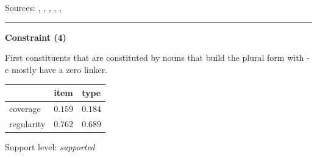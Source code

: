\vspace{0.3em}

\noindent
Sources: \citet[227]{eisenberg_2013}, \citet[572]{fuhrhop_kuerschner_2015}, \citet[9]{kuerschner_2010}, \citet[78]{nuebling_szczepaniak_2013}, \citet[83, 106]{ortner_mueller-bollhagen_1991}, \citet[229]{schaefer_2018}

\vspace{0.35em}
\hrule




\vspace{0.4em}

\begin{center}
\textbf{Constraint (4)}
\end{center}

\noindent
First constituents that are constituted by nouns that build the plural form with -e mostly have a zero linker.
\vspace{0.5em}


\vspace{-0.25em}

\begin{table}[!ht]
\begin{center}
\setlength{\extrarowheight}{1pt}
\begin{tabularx}{\columnwidth}{|X|X|X|}
\hline
 & item & type \\
\hline
 coverage & $0.159$ & $0.184$ \\
\hline
 regularity & $0.762$ & $0.689$ \\
\hline
\end{tabularx}
\end{center}
\end{table}

\vspace{-1.35em}

\noindent
Support level: \textit{supported}

\vspace{0.3em}

